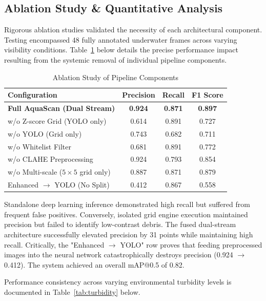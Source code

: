 \documentclass[conference]{IEEEtran}
\begin{document}
\subsection{Ablation Study \& Quantitative Analysis}
Rigorous ablation studies validated the necessity of each architectural component. Testing encompassed 48 fully annotated underwater frames across varying visibility conditions. Table~\ref{tab:ablation} below details the precise performance impact resulting from the systemic removal of individual pipeline components.

\begin{table}[htbp]
\caption{Ablation Study of Pipeline Components}
\begin{center}
\begin{tabular}{lccc}
\toprule
\textbf{Configuration} & \textbf{Precision} & \textbf{Recall} & \textbf{F1 Score} \\
\midrule
\textbf{Full AquaScan (Dual Stream)} & \textbf{0.924} & \textbf{0.871} & \textbf{0.897} \\
\midrule
w/o Z-score Grid (YOLO only) & 0.614 & 0.891 & 0.727 \\
w/o YOLO (Grid only)         & 0.743 & 0.682 & 0.711 \\
w/o Whitelist Filter         & 0.681 & 0.891 & 0.772 \\
w/o CLAHE Preprocessing      & 0.924 & 0.793 & 0.854 \\
w/o Multi-scale ($5\times5$ grid only) & 0.887 & 0.871 & 0.879 \\
\midrule
Enhanced $\rightarrow$ YOLO (No Split) & 0.412 & 0.867 & 0.558 \\
\bottomrule
\end{tabular}
\label{tab:ablation}
\end{center}
\end{table}

Standalone deep learning inference demonstrated high recall but suffered from frequent false positives. Conversely, isolated grid engine execution maintained precision but failed to identify low-contrast debris. The fused dual-stream architecture successfully elevated precision by 31 points while maintaining high recall. Critically, the "Enhanced $\rightarrow$ YOLO" row proves that feeding preprocessed images into the neural network catastrophically destroys precision (0.924 $\rightarrow$ 0.412). The system achieved an overall mAP@0.5 of 0.82.

Performance consistency across varying environmental turbidity levels is documented in Table~\ref{tab:turbidity} below.
\end{document}
